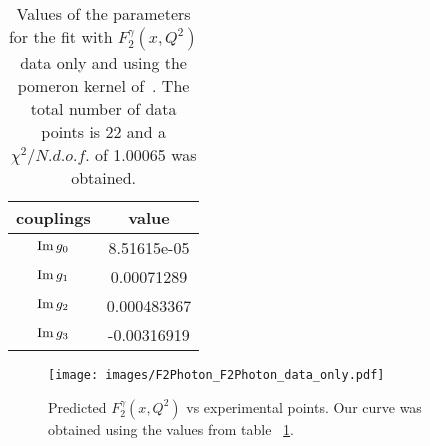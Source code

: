 \documentclass[preprint, 12pt]{elsarticle}
\begin{document}
\begin{table}[b!]
\centering
\caption{Values of the parameters for the fit with $F_2^{\gamma}\left(x, Q^2\right)$ data only and using the pomeron kernel of~\cite{gluonPDF_IHQCD_2020}. The total number of data points is 22 and a $\chi^2 / {N.d.o.f.}$ of 1.00065 was obtained.}
\vspace{0.5cm}
\begin{tabular}{|c|c|}
\hline
couplings   & value \\
\hline
${\rm Im} \, g_0$  & 8.51615e-05\\ 
\hline
${\rm Im} \, g_1$  & 0.00071289 \\ 
\hline
${\rm Im} \, g_2$  & 0.000483367  \\
\hline
${\rm Im} \, g_3$  & -0.00316919\\ 
\hline
\end{tabular}
\label{table:F2Photon_best_fit}
\end{table}

\begin{figure}[!b]
\center
\texttt{[image: images/F2Photon\_F2Photon\_data\_only.pdf]} 
\caption{Predicted $F_2^\gamma\left(x, Q^2\right)$ vs experimental points. Our curve was obtained using the values from table ~\ref{table:F2Photon_best_fit}.}
\label{fig:F2Photon_best_fit_F2_data_only}
\end{figure}
\end{document}

